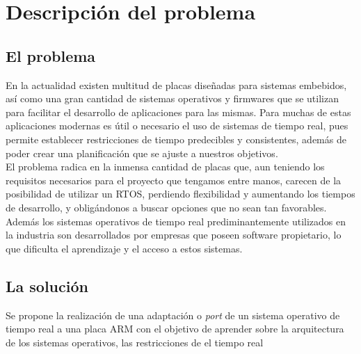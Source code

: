 \chapter{Descripción del problema}
\section{El problema}
En la actualidad existen multitud de placas diseñadas para sistemas embebidos, así como una gran cantidad de sistemas operativos y firmwares que se utilizan para facilitar el desarrollo de aplicaciones para las mismas.
Para muchas de estas aplicaciones modernas es útil o necesario el uso de sistemas de tiempo real, pues permite establecer restricciones de tiempo predecibles y consistentes, además de poder crear una planificación que se ajuste a nuestros objetivos.\\
El problema radica en la inmensa cantidad de placas que, aun teniendo los requisitos necesarios para el proyecto que tengamos entre manos, carecen de la posibilidad de utilizar un RTOS, perdiendo flexibilidad y aumentando los tiempos de desarrollo, y obligándonos a buscar opciones que no sean tan favorables.
Además los sistemas operativos de tiempo real prediminantemente utilizados en la industria son desarrollados por empresas que poseen software propietario, lo que dificulta el aprendizaje y el acceso a estos sistemas.


\section{La solución}
Se propone la realización de una adaptación o \textit{port} de un sistema operativo de tiempo real a una placa ARM con el objetivo de aprender sobre la arquitectura de los sistemas operativos, las restricciones de el tiempo real 

